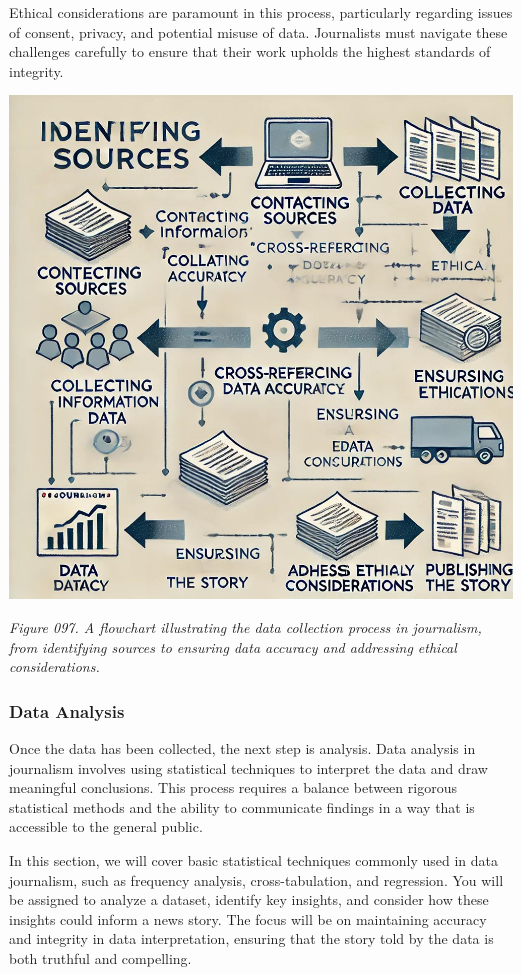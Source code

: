 \documentclass[
]{book}
\begin{document}
Ethical considerations are paramount in this process, particularly regarding issues of consent, privacy, and potential misuse of data. Journalists must navigate these challenges carefully to ensure that their work upholds the highest standards of integrity.

\includegraphics[width=1\textwidth,height=\textheight]{images/fig097.jpg}

\emph{Figure 097. A flowchart illustrating the data collection process in journalism, from identifying sources to ensuring data accuracy and addressing ethical considerations.}

\subsubsection{Data Analysis}\label{data-analysis}

Once the data has been collected, the next step is analysis. Data analysis in journalism involves using statistical techniques to interpret the data and draw meaningful conclusions. This process requires a balance between rigorous statistical methods and the ability to communicate findings in a way that is accessible to the general public.

In this section, we will cover basic statistical techniques commonly used in data journalism, such as frequency analysis, cross-tabulation, and regression. You will be assigned to analyze a dataset, identify key insights, and consider how these insights could inform a news story. The focus will be on maintaining accuracy and integrity in data interpretation, ensuring that the story told by the data is both truthful and compelling.
\end{document}
